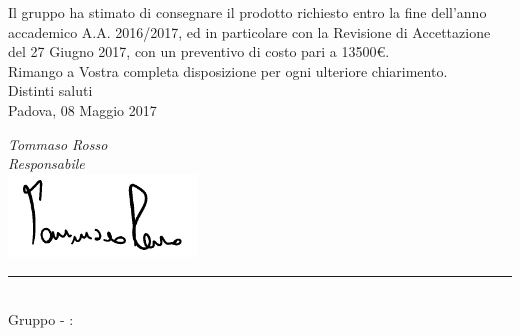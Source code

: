 \begin{titlepage}
	\begin{large}
	Il gruppo \GroupName{} ha stimato di consegnare il prodotto richiesto entro la fine dell'anno accademico A.A. 2016/2017, ed in particolare con la Revisione di Accettazione del 27 Giugno 2017, con un preventivo di costo pari a 13500€.\\
	
	Rimango a Vostra completa disposizione per ogni ulteriore chiarimento. \\
	Distinti saluti\\
	 
	Padova, 08 Maggio 2017
	\begin{flushright}
		\emph{Tommaso Rosso} \\ 
		\emph{Responsabile \GroupName{}} \\
		\includegraphics[width=5cm]{../../firme/TR.png}
 	\end{flushright}
	
	\end{large}
	
	\vspace{1cm} 
	\begin{center}
		\rule{13cm}{0,03cm} \\
		Gruppo \GroupName{} - \email: \GroupEmail{}
	\end{center} 
	
	\vspace{0.2cm}
	
\end{titlepage}
  
 \restoregeometry
